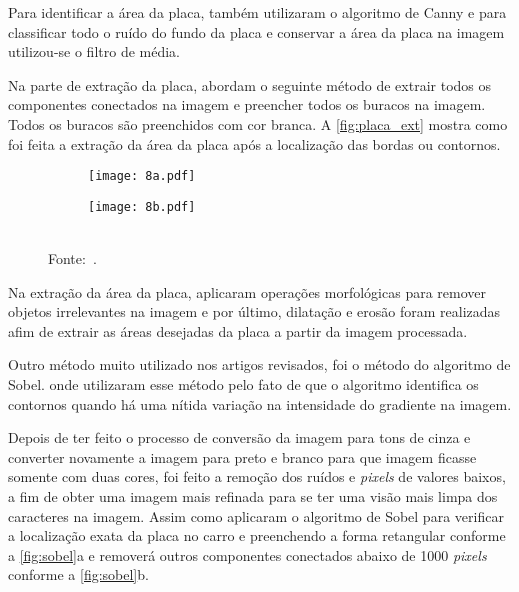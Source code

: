 Para identificar a área da placa, \cite{islam2015} também utilizaram o algoritmo de Canny e para classificar todo o ruído do fundo da placa e conservar a área da placa na imagem utilizou-se o filtro de média.

Na parte de extração da placa,  abordam o seguinte método de extrair todos os componentes conectados na imagem e preencher todos os buracos na imagem. Todos os buracos são preenchidos com cor branca. A \autoref{fig:placa_ext} mostra como foi feita a extração da área da placa após a localização das bordas ou contornos.

\begin{figure}[htb]
	\centering
	\caption[\footnotesize Extração da placa após a detecção de contorno.]{\footnotesize Extração da Placa após a detecção de contorno. a) Área da placa preenchida na cor branca; e b) Área da placa extraída após o processo de preenchimento.}   %
	\label{fig:placa_ext}
	\begin{subfigure}{.4\textwidth}
		\centering
		\texttt{[image: 8a.pdf]}
		\caption{ }
	\end{subfigure}
	\begin{subfigure}{.4\textwidth}
		\centering
		\texttt{[image: 8b.pdf]}
		\caption{ }
	\end{subfigure}
	\\
	{\footnotesize Fonte:~.}
\end{figure}

Na extração da área da placa, \cite{islam2015} aplicaram operações morfológicas para remover objetos irrelevantes na imagem e por último, dilatação e erosão foram realizadas afim de extrair as áreas desejadas da placa a partir da imagem processada.

Outro método muito utilizado nos artigos revisados, foi o método do algoritmo de Sobel.  onde  utilizaram esse método pelo fato de que o algoritmo identifica os contornos quando há uma nítida variação na intensidade do gradiente na imagem. 

Depois de ter feito o processo de conversão da imagem para tons de cinza e converter novamente a imagem para preto e branco para que imagem ficasse somente com duas cores, foi feito a remoção dos ruídos e \emph{pixels} de valores baixos, a fim de obter uma imagem mais refinada para se ter uma visão mais limpa dos caracteres na imagem. Assim como  aplicaram o algoritmo de Sobel para verificar a localização exata da placa no carro e preenchendo a forma retangular conforme a \autoref{fig:sobel}a e removerá outros componentes conectados abaixo de 1000 \emph{pixels} conforme a \autoref{fig:sobel}b.

